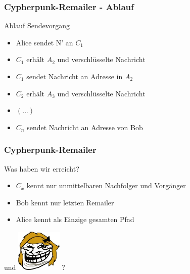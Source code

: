 \documentclass{beamer}
\begin{document}
\begin{frame}
	\frametitle{Cypherpunk-Remailer - Ablauf}
	\begin{block}{Ablauf Sendevorgang}
		\begin{itemize}
			\item Alice sendet N' an \(C_1\)
			\item \(C_1\) erhält \(A_2\) und verschlüsselte Nachricht
			\item \(C_1\) sendet Nachricht an Adresse in \(A_2\)
			\item \(C_2\) erhält \(A_3\) und verschlüsselte Nachricht
			\item \((...)\)
			\item \(C_n\) sendet Nachricht an Adresse von Bob
		\end{itemize}	
	\end{block}
\end{frame}

\begin{frame}
	\frametitle{Cypherpunk-Remailer}
	\begin{exampleblock}{Was haben wir erreicht?}	
		\begin{itemize}	
			\item \(C_x\) kennt nur unmittelbaren Nachfolger und Vorgänger
			\item Bob kennt nur letzten Remailer
			\item Alice kennt als Einzige gesamten Pfad
		\end{itemize}	
	\end{exampleblock}
	\begin{center}
		und \includegraphics[height=2cm]{bilder/eve.jpg} ?
	\end{center}			
\end{frame}	
\end{document}
